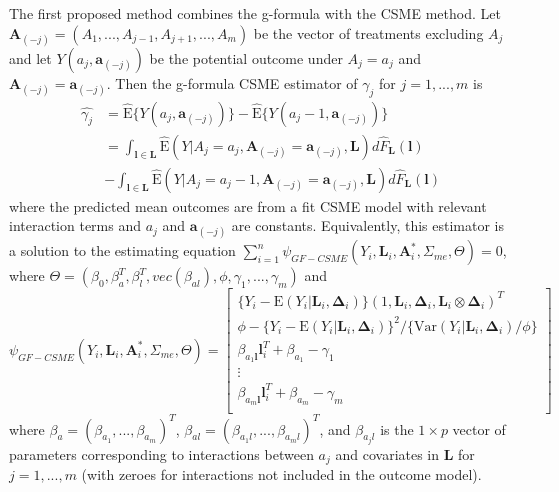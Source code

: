 \documentclass[useAMS,usenatbib,referee]{biom}
\begin{document}
\sloppy The first proposed method combines the g-formula with the CSME method. Let $\bm{A}_{(-j)} = (A_{1}, ..., A_{j-1}, A_{j+1}, ..., A_{m})$ be the vector of treatments excluding $A_{j}$ and let $Y(a_{j}, \bm{a}_{(-j)})$ be the potential outcome under $A_{j} = a_{j}$ and $\bm{A}_{(-j)} = \bm{a}_{(-j)}$. Then the g-formula CSME estimator of $\gamma_{j}$ for $j = 1,...,m$ is
\begin{align*}
    \hat{\gamma_{j}} &= \hat{\text{E}}\{ Y(a_{j}, \bm{a}_{(-j)}) \} - \hat{\text{E}}\{ Y(a_{j} - 1, \bm{a}_{(-j)}) \} \\
    &= \int_{\bm{l} \in \bm{L}} \hat{\text{E}}(Y | A_{j} = a_{j}, \bm{A}_{(-j)} = \bm{a}_{(-j)}, \bm{L}) d\hat{F}_{\bm{L}}(\bm{l}) \\
    &- \int_{\bm{l} \in \bm{L}} \hat{\text{E}}(Y | A_{j} = a_{j} - 1, \bm{A}_{(-j)} = \bm{a}_{(-j)}, \bm{L}) d\hat{F}_{\bm{L}}(\bm{l})
\end{align*}
where the predicted mean outcomes are from a fit CSME model with relevant interaction terms and $a_{j}$ and $\bm{a}_{(-j)}$ are constants. Equivalently, this estimator is a solution to the estimating equation $\sum_{i=1}^{n} \psi_{GF-CSME}(Y_{i}, \bm{L}_{i}, \bm{A}_{i}^{*}, \Sigma_{me}, \Theta) = 0$, where $\Theta = (\beta_{0}, \beta^{T}_{a}, \beta^{T}_{l}, vec(\beta_{al}), \phi, \gamma_{1}, ..., \gamma_{m})$ and
\begin{equation}
    \psi_{GF-CSME}(Y_{i}, \bm{L}_{i}, \bm{A}^{*}_{i}, \Sigma_{me}, \Theta) =
    \begin{bmatrix}
       \{ Y_{i} - \text{E}(Y_{i} | \bm{L}_{i}, \bm{\Delta}_{i}) \} (1, \bm{L}_{i}, \bm{\Delta}_{i}, \bm{L}_{i} \otimes \bm{\Delta}_{i})^{T} \\
        \phi - \{ Y_{i} - \text{E}(Y_{i} | \bm{L}_{i}, \bm{\Delta}_{i}) \}^{2} / \{ \text{Var}(Y_{i} | \bm{L}_{i}, \bm{\Delta}_{i}) / \phi \} \\
        \beta_{a_{1}\bm{l}}\bm{l}_{i}^{T} + \beta_{a_{1}} - \gamma_{1} \\
        \vdots \\
        \beta_{a_{m}\bm{l}}\bm{l}_{i}^{T} + \beta_{a_{m}} - \gamma_{m} \\
    \end{bmatrix}
\end{equation}
where $\beta_{a} = (\beta_{a_{1}},...,\beta_{a_{m}})^{T}$, $\beta_{al} = (\beta_{a_{1}l}, ..., \beta_{a_{m}l})^{T}$, and $\beta_{a_{j}l}$ is the $1 \times p$ vector of parameters corresponding to interactions between $a_{j}$ and covariates in $\textbf{L}$ for $j = 1,...,m$ (with zeroes for interactions not included in the outcome model).
\end{document}
